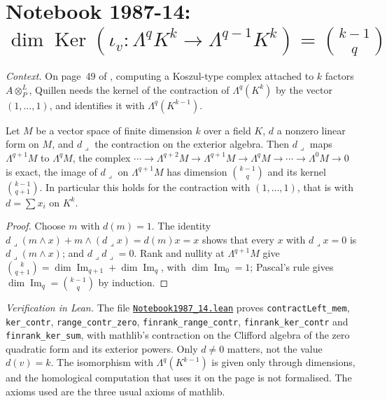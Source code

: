 \section[Notebook 1987-14: the kernel of the contraction by (1, ..., 1)]{Notebook 1987-14: $\dim\operatorname{Ker}(\iota_v : \Lambda^q K^k \to \Lambda^{q-1}K^k) = \binom{k-1}{q}$\protect{}}\label{sec:quillen-1987-14}

\emph{Context.} On page~49 of , computing a Koszul-type complex attached to $k$ factors $A \otimes^L_P$, Quillen needs the kernel of the contraction of $\Lambda^q(K^k)$ by the vector $(1, \dots, 1)$, and identifies it with $\Lambda^q(K^{k-1})$.

\begin{encadre}
\begin{theoreme}\label{thm:quillen-1987-14}
Let $M$ be a vector space of finite dimension $k$ over a field $K$, $d$ a nonzero linear form on $M$, and $d\lrcorner$ the contraction on the exterior algebra. Then $d\lrcorner$ maps $\Lambda^{q+1}M$ to $\Lambda^q M$, the complex $\cdots \to \Lambda^{q+2}M \to \Lambda^{q+1}M \to \Lambda^qM \to \cdots \to \Lambda^0M \to 0$ is exact, the image of $d\lrcorner$ on $\Lambda^{q+1}M$ has dimension $\binom{k-1}{q}$ and its kernel $\binom{k-1}{q+1}$. In particular this holds for the contraction with $(1, \dots, 1)$, that is with $d = \sum x_i$ on $K^k$.
\end{theoreme}
\end{encadre}

\begin{proof}
Choose $m$ with $d(m) = 1$. The identity $d\lrcorner(m \wedge x) + m \wedge (d\lrcorner x) = d(m)x = x$ shows that every $x$ with $d\lrcorner x = 0$ is $d\lrcorner(m \wedge x)$; and $d\lrcorner d\lrcorner = 0$. Rank and nullity at $\Lambda^{q+1}M$ give $\binom{k}{q+1} = \dim\operatorname{Im}_{q+1} + \dim\operatorname{Im}_q$, with $\dim\operatorname{Im}_0 = 1$; Pascal's rule gives $\dim\operatorname{Im}_q = \binom{k-1}{q}$ by induction.
\end{proof}

\emph{Verification in Lean.} The file \href{\leanblobmain/Notebook1987_14.lean}{\texttt{Notebook1987\_14.\allowbreak{}lean}} proves \texttt{contractLeft\_mem}, \texttt{ker\_contr}, \texttt{range\_contr\_zero}, \texttt{finrank\_range\_contr}, \texttt{finrank\_ker\_contr} and \texttt{finrank\_ker\_sum}, with mathlib's contraction on the Clifford algebra of the zero quadratic form and its exterior powers. Only $d \ne 0$ matters, not the value $d(v) = k$. The isomorphism with $\Lambda^q(K^{k-1})$ is given only through dimensions, and the homological computation that uses it on the page is not formalised. The axioms used are the three usual axioms of mathlib.

